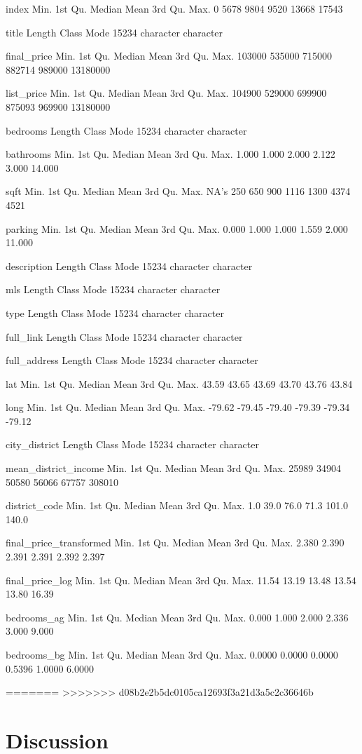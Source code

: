 \documentclass[11pt,]{article}
\begin{document}
index Min. 1st Qu. Median Mean 3rd Qu. Max. 0 5678 9804 9520 13668 17543

title Length Class Mode 15234 character character

final\_price Min. 1st Qu. Median Mean 3rd Qu. Max. 103000 535000 715000
882714 989000 13180000

list\_price Min. 1st Qu. Median Mean 3rd Qu. Max. 104900 529000 699900
875093 969900 13180000

bedrooms Length Class Mode 15234 character character

bathrooms Min. 1st Qu. Median Mean 3rd Qu. Max. 1.000 1.000 2.000 2.122
3.000 14.000

sqft Min. 1st Qu. Median Mean 3rd Qu. Max. NA's 250 650 900 1116 1300
4374 4521

parking Min. 1st Qu. Median Mean 3rd Qu. Max. 0.000 1.000 1.000 1.559
2.000 11.000

description Length Class Mode 15234 character character

mls Length Class Mode 15234 character character

type Length Class Mode 15234 character character

full\_link Length Class Mode 15234 character character

full\_address Length Class Mode 15234 character character

lat Min. 1st Qu. Median Mean 3rd Qu. Max. 43.59 43.65 43.69 43.70 43.76
43.84

long Min. 1st Qu. Median Mean 3rd Qu. Max. -79.62 -79.45 -79.40 -79.39
-79.34 -79.12

city\_district Length Class Mode 15234 character character

mean\_district\_income Min. 1st Qu. Median Mean 3rd Qu. Max. 25989 34904
50580 56066 67757 308010

district\_code Min. 1st Qu. Median Mean 3rd Qu. Max. 1.0 39.0 76.0 71.3
101.0 140.0

final\_price\_transformed Min. 1st Qu. Median Mean 3rd Qu. Max. 2.380
2.390 2.391 2.391 2.392 2.397

final\_price\_log Min. 1st Qu. Median Mean 3rd Qu. Max. 11.54 13.19
13.48 13.54 13.80 16.39

bedrooms\_ag Min. 1st Qu. Median Mean 3rd Qu. Max. 0.000 1.000 2.000
2.336 3.000 9.000

bedrooms\_bg Min. 1st Qu. Median Mean 3rd Qu. Max. 0.0000 0.0000 0.0000
0.5396 1.0000 6.0000

=======
>>>>>>> d08b2e2b5dc0105ca12693f3a21d3a5c2c36646b
\hypertarget{discussion}{%
\section{Discussion}\label{discussion}}
\end{document}
